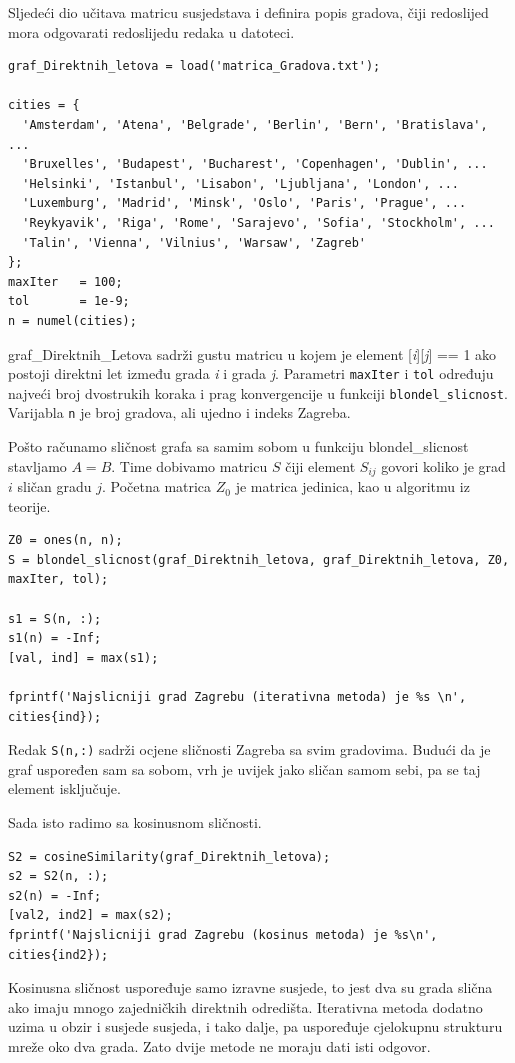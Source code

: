 \documentclass[12pt, letterpaper]{article}
\numberwithin{figure}{section}
\begin{document}
Sljedeći dio učitava matricu susjedstava i definira popis gradova, čiji redoslijed mora odgovarati redoslijedu redaka u datoteci.

\begin{lstlisting}[style=octave, caption={Učitavanje grafa direktnih letova}, label={lst:gradovi_ucitavanje}]
graf_Direktnih_letova = load('matrica_Gradova.txt');

cities = {
  'Amsterdam', 'Atena', 'Belgrade', 'Berlin', 'Bern', 'Bratislava', ...
  'Bruxelles', 'Budapest', 'Bucharest', 'Copenhagen', 'Dublin', ...
  'Helsinki', 'Istanbul', 'Lisabon', 'Ljubljana', 'London', ...
  'Luxemburg', 'Madrid', 'Minsk', 'Oslo', 'Paris', 'Prague', ...
  'Reykyavik', 'Riga', 'Rome', 'Sarajevo', 'Sofia', 'Stockholm', ...
  'Talin', 'Vienna', 'Vilnius', 'Warsaw', 'Zagreb'
};
maxIter   = 100;
tol       = 1e-9;
n = numel(cities);
\end{lstlisting}
graf\_Direktnih\_Letova sadrži gustu matricu u kojem je element [\textit{i}][\textit{j}] == 1 ako postoji direktni let između grada \textit{i} i grada \textit{j}. Parametri \texttt{maxIter} i \texttt{tol} određuju najveći broj dvostrukih koraka i prag konvergencije u funkciji \texttt{blondel\_slicnost}. Varijabla \texttt{n} je broj gradova, ali ujedno i indeks Zagreba.

Pošto računamo sličnost grafa sa samim sobom u funkciju blondel\_slicnost stavljamo $A=B$. Time dobivamo matricu $S$ čiji element $S_{ij}$ govori koliko je grad $i$ sličan gradu $j$. Početna matrica $Z_0$ je matrica jedinica, kao u algoritmu iz teorije.

\begin{lstlisting}[style=octave, caption={Iterativna metoda: najsličniji grad Zagrebu}, label={lst:gradovi_blondel}]
Z0 = ones(n, n);
S = blondel_slicnost(graf_Direktnih_letova, graf_Direktnih_letova, Z0, maxIter, tol);

s1 = S(n, :);              
s1(n) = -Inf;             
[val, ind] = max(s1);

fprintf('Najslicniji grad Zagrebu (iterativna metoda) je %s \n', cities{ind});
\end{lstlisting}
Redak \texttt{S(n,:)} sadrži ocjene sličnosti Zagreba sa svim gradovima. Budući da je graf uspoređen sam sa sobom, vrh je uvijek jako sličan samom sebi, pa se taj element isključuje. 

Sada isto radimo sa kosinusnom sličnosti.

\begin{lstlisting}[style=octave, caption={Kosinusna sličnost i spremanje rezultata}, label={lst:gradovi_cos}]
S2 = cosineSimilarity(graf_Direktnih_letova);
s2 = S2(n, :);
s2(n) = -Inf;              
[val2, ind2] = max(s2);
fprintf('Najslicniji grad Zagrebu (kosinus metoda) je %s\n', cities{ind2});
\end{lstlisting}
Kosinusna sličnost uspoređuje samo izravne susjede, to jest dva su grada slična ako imaju mnogo zajedničkih direktnih odredišta. Iterativna metoda dodatno uzima u obzir i susjede susjeda, i tako dalje, pa uspoređuje cjelokupnu strukturu mreže oko dva grada. Zato dvije metode ne moraju dati isti odgovor.
\end{document}
